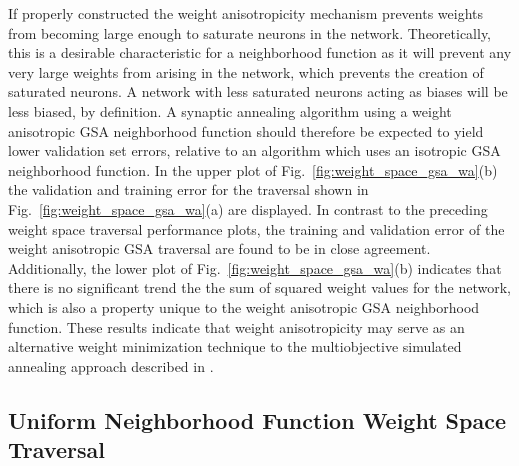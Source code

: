 \documentclass[11pt]{afthesis}
\begin{document}
	If properly constructed the weight anisotropicity mechanism prevents weights from becoming large enough to saturate neurons in the network. Theoretically, this is a desirable characteristic for a neighborhood function as it will prevent any very large weights from arising in the network, which prevents the creation of saturated neurons. A network with less saturated neurons acting as biases will be less biased, by definition. A synaptic annealing algorithm using a weight anisotropic GSA neighborhood function should therefore be expected to yield lower validation set errors, relative to an algorithm which uses an isotropic GSA neighborhood function. In the upper plot of Fig.~\ref{fig:weight_space_gsa_wa}(b) the validation and training error for the traversal shown in Fig.~\ref{fig:weight_space_gsa_wa}(a) are displayed. In contrast to the preceding weight space traversal performance plots, the training and validation error of the weight anisotropic GSA traversal are found to be in close agreement. Additionally, the lower plot of Fig.~\ref{fig:weight_space_gsa_wa}(b) indicates that there is no significant trend the the sum of squared weight values for the network, which is also a property unique to the weight anisotropic GSA neighborhood function. These results indicate that weight anisotropicity may serve as an alternative weight minimization technique to the multiobjective simulated annealing approach described in \cite{lee2007improvinggeneralizationcapabilitynnusingsa}.
	
	\subsection{Uniform Neighborhood Function Weight Space Traversal} 
	
\end{document}
